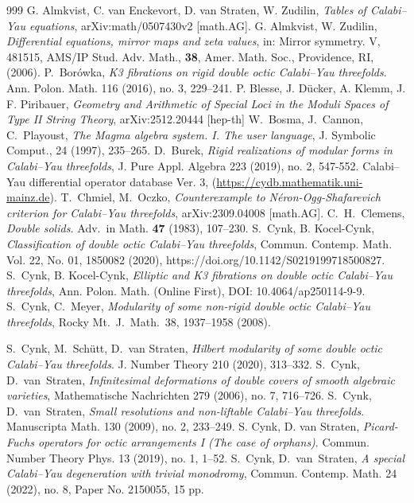 \documentclass[12pt]{amsart}
\theoremstyle{plain}
\theoremstyle{remark}
\theoremstyle{definition}
\numberwithin{table}{section}
\begin{document}
\begin{thebibliography}{999}
G. Almkvist, C. van Enckevort, D. van Straten, W. Zudilin, \emph{Tables of Calabi--Yau equations}, arXiv:math/0507430v2 [math.AG].
 G. Almkvist, W. Zudilin, {\em Differential equations, mirror maps and zeta values}, in: Mirror symmetry. V, 481515, AMS/IP Stud. Adv. Math., {\bf 38}, Amer. Math. Soc., Providence, RI, (2006).
 P.~Bor\'owka,  \emph{K3 fibrations on rigid double octic
    Calabi--Yau threefolds}. Ann. Polon. Math. 116 (2016), no. 3,
  229--241.
P. Blesse, J. Dücker, A. Klemm, J. F. Piribauer, \emph{Geometry and Arithmetic of Special Loci in the Moduli Spaces of Type II String Theory},
arXiv:2512.20444 [hep-th]
W.~Bosma, J.~Cannon, C.~Playoust, \emph{The Magma algebra system. I. The user language}, J. Symbolic Comput., 24
  (1997), 235--265.
D.~Burek, \emph{Rigid realizations of modular forms in
    Calabi--Yau threefolds}, J. Pure Appl. Algebra 223 (2019), no. 2, 547-552.
Calabi--Yau differential operator database  Ver. 3,  (\url{https://cydb.mathematik.uni-mainz.de}).
T.~Chmiel, M.~Oczko, \emph{Counterexample to Néron-Ogg-Shafarevich criterion for Calabi--Yau threefolds}, 	arXiv:2309.04008 [math.AG].
 C.~H.~Clemens, \emph{Double solids.} Adv.\ in
Math. \textbf{47} (1983), 107--230.
S.~Cynk, B. Kocel-Cynk, \emph{Classification of double
    octic Calabi--Yau threefolds}, Commun. Contemp. Math. Vol. 22, No. 01, 1850082 (2020),
   https://doi.org/10.1142/S0219199718500827.
  S.~Cynk, B. Kocel-Cynk, \emph{Elliptic and K3 fibrations on double octic Calabi--Yau threefolds}, Ann. Polon. Math. (Online First), DOI: 10.4064/ap250114-9-9.
 S.~Cynk, C.~Meyer,
\emph{Modularity of some non-rigid double octic Calabi--Yau threefolds},
Rocky Mt.\ J.\ Math.\ 38, 1937--1958 (2008).

S.~Cynk, M.~Schütt, D.~van Straten, \emph{Hilbert modularity of some double octic Calabi--Yau threefolds}. J. Number Theory 210 (2020), 313--332.
 S.~Cynk, D.~van~Straten, \emph{Infinitesimal
    deformations of double covers of smooth algebraic varieties},
  Mathematische Nachrichten 279 (2006), no. 7, 716--726.
 S.~Cynk, D.~van~Straten, \emph{Small resolutions and
    non-liftable Calabi--Yau threefolds}. Manuscripta Math. 130 (2009),
  no. 2, 233--249.
S. Cynk, D. van Straten, \emph{Picard-Fuchs operators for octic arrangements I (The case of orphans)}. Commun. Number Theory Phys. 13 (2019), no. 1, 1--52.
        S.~Cynk, D.~van~Straten, \emph{A special Calabi--Yau degeneration with trivial monodromy},
Commun. Contemp. Math. 24 (2022), no. 8, Paper No. 2150055, 15 pp.


\end{thebibliography}
\end{document}
